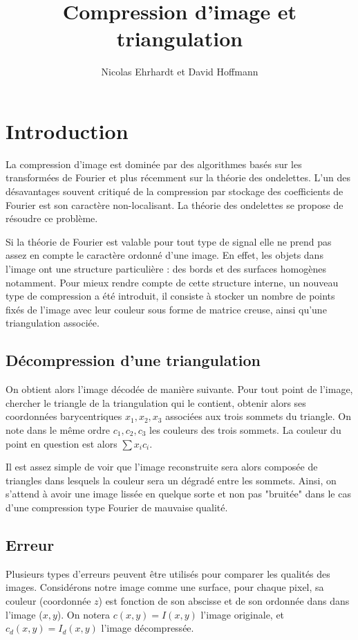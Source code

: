 \documentclass{report}
\author{Nicolas Ehrhardt et David Hoffmann}
\title{Compression d'image et triangulation}
\begin{document}
\maketitle
\section{Introduction}

La compression d'image est dominée par des algorithmes basés sur les transformées de Fourier et plus récemment sur la théorie des ondelettes. L'un des désavantages souvent critiqué de la compression par stockage des coefficients de Fourier est son caractère non-localisant. La théorie des ondelettes se propose de résoudre ce problème.

Si la théorie de Fourier est valable pour tout type de signal elle ne prend pas assez en compte le caractère ordonné d'une image. En effet, les objets dans l'image ont une structure particulière : des bords et des surfaces homogènes notamment. Pour mieux rendre compte de cette structure interne, un nouveau type de compression a été introduit, il consiste à stocker un nombre de points fixés de l'image avec leur couleur sous forme de matrice creuse, ainsi qu'une triangulation associée.

\subsection{Décompression d'une triangulation}

On obtient alors l'image décodée de manière suivante. Pour tout point de l'image, chercher le triangle de la triangulation qui le contient, obtenir alors ses coordonnées barycentriques $x_1, x_2, x_3$ associées aux trois sommets du triangle. On note dans le même ordre $c_1, c_2, c_3$ les couleurs des trois sommets. La couleur du point en question est alors $\sum x_i c_i$.

Il est assez simple de voir que l'image reconstruite sera alors composée de triangles dans lesquels la couleur sera un dégradé entre les sommets. Ainsi, on s'attend à avoir une image lissée en quelque sorte et non pas "bruitée" dans le cas d'une compression type Fourier de mauvaise qualité.

\subsection{Erreur}

Plusieurs types d'erreurs peuvent être utilisés pour comparer les qualités des images. Considérons notre image comme une surface, pour chaque pixel, sa couleur (coordonnée $z$) est fonction de son abscisse et de son ordonnée dans dans l'image ($x, y$). On notera $c(x, y) = I(x, y)$ l'image originale, et $c_d(x, y) = I_d(x, y)$ l'image décompressée.
\end{document}
